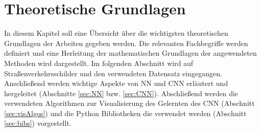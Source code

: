 \newpage
\section{Theoretische Grundlagen} \label{infos}
In diesem Kapitel soll eine Übersicht über die wichtigsten theoretischen Grundlagen der Arbeiten gegeben werden. Die relevanten Fachbegriffe werden definiert und eine Herleitung der mathematischen Grundlagen der angewendeten Methoden wird dargestellt. Im folgenden Abschnitt wird auf Straßenverkehrsschilder und den verwendeten Datensatz eingegangen.  Anschließend werden wichtige Aspekte von \ac{NN} und \ac{CNN} erläutert und hergeleitet (Abschnitte \ref{sec:NN} bzw. \ref{sec:CNN}). Abschließend werden die verwendeten Algorithmen zur Visualisierung des Gelernten des \ac{CNN} (Abschnitt \ref{sec:visAlgos}) und die Python Bibliotheken die verwendet werden (Abschnitt \ref{sec:bibs}) vorgestellt. 
 



